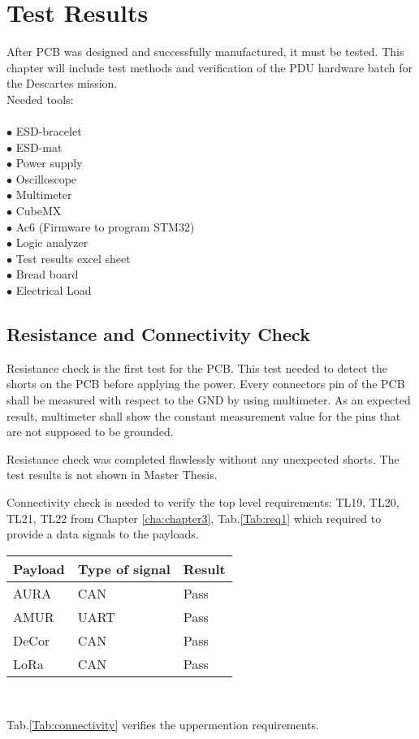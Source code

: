 \chapter{Test Results \label{6}}
After PCB was designed and successfully manufactured, it must be tested.
This chapter will include test methods and verification of the PDU hardware batch for the Descartes mission.
\\
Needed tools:\\ \\
$\bullet$ ESD-bracelet\\
$\bullet$ ESD-mat\\
$\bullet$ Power supply\\
$\bullet$ Oscilloscope\\
$\bullet$ Multimeter\\
$\bullet$ CubeMX\\
$\bullet$ Ac6 (Firmware to program STM32)\\
$\bullet$ Logic analyzer\\
$\bullet$ Test results excel sheet\\
$\bullet$ Bread board\\
$\bullet$ Electrical Load\\



\section{Resistance and Connectivity Check }


Resistance check is the first test for the PCB. This test needed to detect the shorts on the PCB before applying the power.
Every connectors pin of the PCB shall be measured with respect to the GND by using multimeter. As an expected result, multimeter shall show the constant measurement value for the pins that are not supposed to be grounded.

Resistance check was completed flawlessly without any unexpected shorts. The test results is not shown in Master Thesis. 

Connectivity check is needed to verify the top level requirements: TL19, TL20, TL21, TL22 from Chapter \ref{cha:chapter3}, Tab.\ref{Tab:req1} which required to provide a data signals to the payloads.


\begin{center}
	

	\begin{tabular}{p{3cm}p{3cm}p{2cm}} \toprule
		
	Payload & Type of signal & Result \\ \midrule
	AURA & CAN & Pass\\
	AMUR & UART & Pass\\  
	DeCor & CAN & Pass\\
	LoRa & CAN & Pass\\
	\bottomrule
\end{tabular}\\ 

\end{center}
\label{Tab:connectivity}
Tab.\ref{Tab:connectivity} verifies the uppermention requirements.
